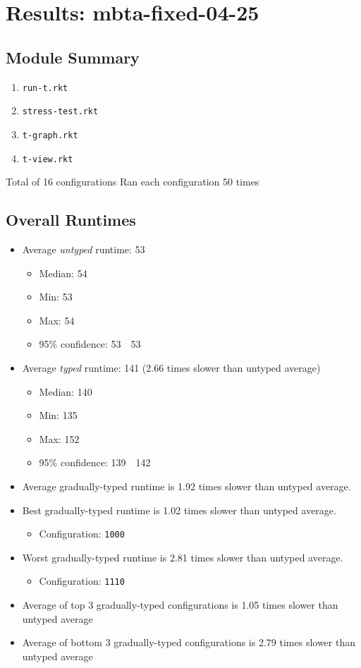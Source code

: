 \documentclass{article}
\newcommand{\mono}[1]{\texttt{#1}}
\begin{document}


\section{Results: mbta-fixed-04-25}

\subsection{Module Summary}
\begin{enumerate}
\item \mono{run-t.rkt}
\item \mono{stress-test.rkt}
\item \mono{t-graph.rkt}
\item \mono{t-view.rkt}\end{enumerate}
Total of 16 configurations
Ran each configuration 50 times

\subsection{Overall Runtimes}
\begin{itemize}
\item Average \emph{untyped} runtime: 53
  \begin{itemize}
  \item Median: 54
  \item Min: 53
  \item Max: 54
  \item 95\% confidence: 53~\textendash~53\end{itemize}
\item Average \emph{typed} runtime: 141 (2.66 times slower than untyped average)
  \begin{itemize}
  \item Median: 140
  \item Min: 135
  \item Max: 152
  \item 95\% confidence: 139~\textendash~142
\end{itemize}
\item Average gradually-typed runtime is 1.92 times slower than untyped average.
\item Best gradually-typed runtime is 1.02 times slower than untyped average.
\begin{itemize}\item Configuration: \mono{1000}\end{itemize}
\item Worst gradually-typed runtime is 2.81 times slower than untyped average.
\begin{itemize}\item Configuration: \mono{1110}\end{itemize}
\item Average of top 3 gradually-typed configurations is 1.05 times slower than untyped average
\item Average of bottom 3 gradually-typed configurations is 2.79 times slower than untyped average
\end{itemize}
\end{document}
